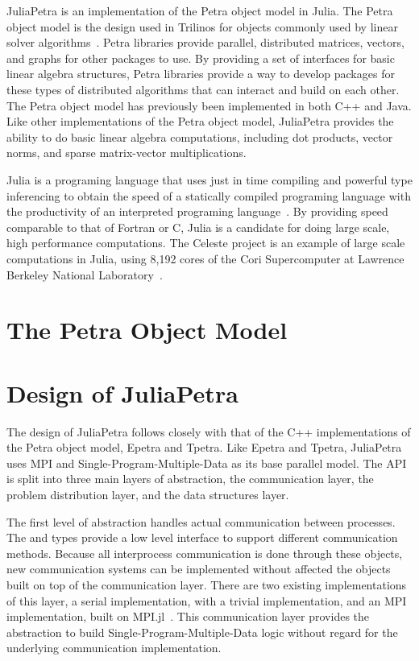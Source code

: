 \documentclass[acmsmall]{acmart}
\newcommand{\snippet}[1]{\texttt{\detokenize{#1}}}
\begin{document}
	JuliaPetra is an implementation of the Petra object model in Julia.
	The Petra object model is the design used in Trilinos for objects commonly used by linear solver algorithms~\cite{Heroux:2005:Trilinos}.
	Petra libraries provide parallel, distributed matrices, vectors, and graphs for other packages to use.
	By providing a set of interfaces for basic linear algebra structures, Petra libraries provide a way
	to develop packages for these types of distributed algorithms that can interact and build on each other.
	The Petra object model has previously been implemented in both C++ and Java.
	Like other implementations of the Petra object model, JuliaPetra provides the ability to do basic linear algebra computations, including dot products, vector norms, and sparse matrix-vector multiplications.
	
	Julia is a programing language that uses just in time compiling and powerful type inferencing
	to obtain the speed of a statically compiled programing language with the productivity of an
	interpreted programing language~\cite{Bezanson:2017:FreshApproach}.
	By providing speed comparable to that of Fortran or C, Julia is a candidate for doing large scale,
	high performance computations.
	The Celeste project is an example of large scale computations in Julia,
	using 8,192 cores of the Cori Supercomputer
	at Lawrence Berkeley National Laboratory~\cite{Bezanson:2017:FreshApproach}.
	
	\section{The Petra Object Model}
	
	
	\section{Design of JuliaPetra}
	
	The design of JuliaPetra follows closely with that of the C++ implementations of the
	Petra object model, Epetra and Tpetra.
	Like Epetra and Tpetra, JuliaPetra uses MPI and Single-Program-Multiple-Data as its base parallel model.
	The API is split into three main layers of abstraction, the communication layer, the problem distribution layer, and the data structures layer.
	
	The first level of abstraction handles actual communication between processes.
	The \snippet{Comm} and \snippet{Distributor} types provide a low level interface to support different communication methods.
	Because all interprocess communication is done through these objects, new communication systems can be implemented without affected the objects built on top of the communication layer.
	There are two existing implementations of this layer, a serial implementation, with a trivial implementation, and an MPI implementation, built on MPI.jl~\cite{Github:MPI}.
	This communication layer provides the abstraction to build Single-Program-Multiple-Data logic without regard for the underlying communication implementation.
	
\end{document}
